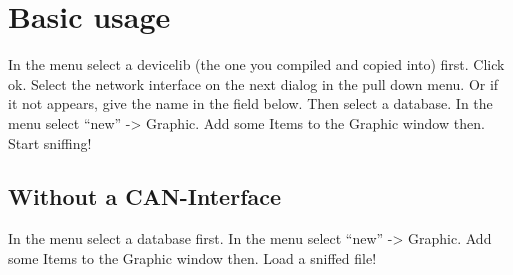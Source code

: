 \documentclass[a4paper,10pt]{article}
\begin{document}
\section{Basic usage}
In the menu select a devicelib (the one you compiled and copied into) first. Click ok. Select the network interface on the next dialog in the pull down menu.
Or if it not appears, give the name in the field below.
Then select a database. In the menu select ``new'' -> Graphic. Add some Items to the Graphic window then. Start sniffing!

\subsection{Without a CAN-Interface}
In the menu select a database first. In the menu select ``new'' -> Graphic. Add some Items to the Graphic window then. Load a sniffed file!
\end{document}

